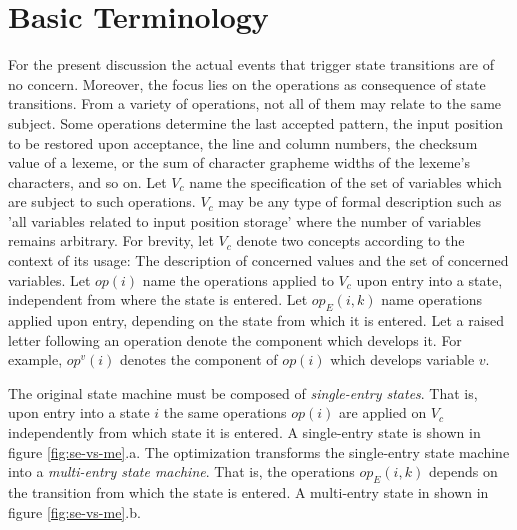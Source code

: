 \documentclass[12pt,a4paper]{scrartcl}
\begin{document}
%
\section{Basic Terminology}

For the present discussion the actual events that trigger state transitions are
of no concern. Moreover, the focus lies on the operations as consequence of
state transitions.  From a variety of operations, not all of them may relate to
the same subject.  Some operations determine the last accepted pattern, the
input position to be restored upon acceptance, the line and column numbers, the
checksum value of a lexeme, or the sum of character grapheme widths of the
lexeme's characters, and so on. Let $V_c$ name the specification of the set of
variables which are subject to such operations. $V_c$ may be any type of formal
description such as 'all variables related to input position storage' where the
number of variables remains arbitrary.  For brevity, let $V_c$ denote two
concepts according to the context of its usage: The description of concerned
values and the set of concerned variables. Let $op(i)$ name the operations
applied to $V_c$ upon entry into a state, independent from where the state is
entered. Let $op_E(i,k)$ name operations applied upon entry, depending on the
state from which it is  entered. Let a raised letter following an operation
denote the component which develops it. For example, $op^v(i)$ denotes the
component of $op(i)$ which develops variable $v$. 

The original state machine must be composed of \textit{single-entry states}.
That is, upon entry into a state $i$ the same operations $op(i)$ are applied on
$V_c$ independently from which state it is entered.  A single-entry state is
shown in figure \ref{fig:se-vs-me}.a. The optimization transforms the
single-entry state machine into a \textit{multi-entry state machine}.  That is,
the operations $op_E(i,k)$ depends on the transition from which the state is
entered. A multi-entry state in shown in figure \ref{fig:se-vs-me}.b.
\end{document}
